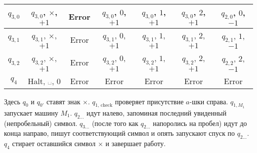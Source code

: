 \documentclass[12pt,a4paper]{article}
\newcommand{\spacesymbol}{\ensuremath{\text{\textvisiblespace}}}
\begin{document}
\begin{enumproblem}
\begin{table}[H]
\begin{tabular}{c||c|c|c|c|c|c}
                \hline
                $q_{3, 0}$& $q_{3, 0}$, $\times$, $+1$& Error& $q_{3, 0}$, $0$, $+1$& $q_{3, 0}$, $1$, $+1$& $q_{3, 0}$, $2$, $+1$& $q_{2, 0}$, $0$, $-1$\\
                \hline
                $q_{3, 1}$& $q_{3, 1}$, $\times$, $+1$& Error& $q_{3, 1}$, $0$, $+1$& $q_{3, 1}$, $1$, $+1$& $q_{3, 1}$, $2$, $+1$& $q_{2, 1}$, $1$, $-1$\\
                \hline
                $q_{3, 2}$& $q_{3, 2}$, $\times$, $+1$& Error& $q_{3, 2}$, $0$, $+1$& $q_{3, 2}$, $1$, $+1$& $q_{3, 2}$, $2$, $+1$& $q_{2, 2}$, $2$, $-1$\\
                \hline
                $q_4$& Halt, \spacesymbol, $0$& Error& Error& Error& Error& Error\\
            \end{tabular}
        \end{table}
        Здесь $q_0$ и $q_{0'}$ ставят знак $\times$. $q_{\text{1, check}}$ проверяет присутствие $a$-шки справа. $q_{1, M_1}$ запускает машину $M_1$. $q_{2\dots}$ идут налево, запоминая последний увиденный (непробельный) символ. $q_{3\dots}$ (после того как $q_{2\dots}$ напоролись на пробел) идут до конца направо, пишут соответствующий символ и опять запускают спуск по $q_{2\dots}$. $q_4$ стирает оставшийся символ $\times$ и завершает работу.
    \end{enumproblem}
\end{document}

